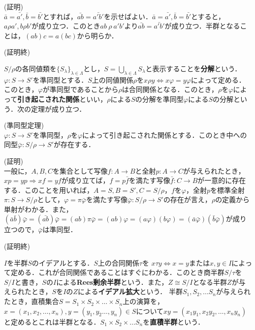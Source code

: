 (証明)\\
$\bar{a}=\bar{a'},\bar{b}=\bar{b'}$とすれば，$\bar{ab}=\bar{a'b'}$を示せばよい．$\bar{a}=\bar{a'},\bar{b}=\bar{b'}$とすると，$a\rho a',b\rho b'$が成り立つ．このとき$ab\:\rho\:a'b'$より$\bar{ab}=\bar{a'b'}$が成り立つ．半群となることは，$(ab)c=a(bc)$から明らか．
\begin{flushright}
(証明終)
\end{flushright}
$S/\rho$の各同値類を$\{S_\lambda\}_{\lambda\in\Lambda}$とし，$S=\displaystyle\bigcup_{\lambda\in\Lambda}S_{\lambda}$と表示することを{\bf 分解}という．
$\varphi:S\rightarrow S'$を準同型とする．$S$上の同値関係$\rho$を$x\rho y\iff x\varphi =y\varphi$によって定める．このとき，$\varphi$が準同型であることから$\rho$は合同関係となる．このとき，$\rho$を$\varphi$によって{\bf 引き起こされた関係}といい，$\rho$による$S$の分解を準同型$\varphi$による$S$の分解という．次の定理が成り立つ．
\begin{sthm}(準同型定理)\\
$\varphi:S\rightarrow S'$を準同型，$\rho$を$\varphi$によって引き起こされた関係とする．このとき中への同型$\bar{\varphi}:S/\rho\rightarrow S'$が存在する．
\end{sthm}
(証明)\\
一般に，$A,B,C$を集合として写像$f:A\rightarrow B$と全射$p:A\rightarrow C$が与えられたとき，$xp=yp\Rightarrow xf=yf$が成り立てば，$f=p\bar{f}$を満たす写像$\bar{f}:C\rightarrow B$が一意的に存在する．このことを用いれば，$A=S,B=S',C=S/\rho$，$f$を$\varphi$，全射$p$を標準全射$\pi:S\rightarrow S/\rho$として，$\varphi=\pi\bar{\varphi}$を満たす写像$\bar{\varphi}:S/\rho\rightarrow S'$の存在が言え，$\rho$の定義から単射がわかる．また，$(\bar{a}\bar{b})\bar{\varphi}=(\bar{ab})\bar{\varphi}=(ab)\pi\bar{\varphi}=(ab)\varphi=(a\varphi)(b\varphi)=(\bar{a}\bar{\varphi})(\bar{b}\bar{\varphi})$が成り立つので，$\bar{\varphi}$は準同型．
\begin{flushright}
(証明終)
\end{flushright}
$I$を半群$S$のイデアルとする．$S$上の合同関係$\tau$を
$x\tau y\iff x=y$または$x,y\in I$によって定める．これが合同関係であることはすぐにわかる．このとき商半群$S/\tau$を$S/I$と書き，$S$の$I$による{\bf Rees剰余半群}という．また，$Z\cong S/I$となる半群$Z$が与えられたとき，$S$を$I$の$Z$による{\bf イデアル拡大}という．
半群$S_1,S_2,\dots S_n$が与えられたとき，直積集合$S=S_1\times S_2\times\dots\times S_n$上の演算を，$x=(x_1,x_2,\dots ,x_n),y=(y_1,y_2\dots,y_n)\in S$について$xy=(x_1y_1,x_2y_2,\dots,x_ny_n)$と定めるとこれは半群となる．$S_1\times S_2\times\dots S_n$を{\bf 直積半群}という．
